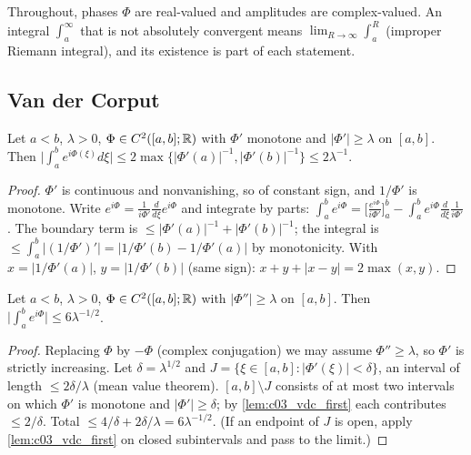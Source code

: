 Throughout, phases $\Phi$ are real-valued and amplitudes are complex-valued. An integral $\int_a^\infty$ that is not absolutely convergent means $\lim_{R\to\infty}\int_a^R$ (improper Riemann integral), and its existence is part of each statement.

\subsection{Van der Corput}

\begin{lemma}
  \label{lem:c03_vdc_first}
  Let $a<b$, $\lambda>0$, $\Phi\in C^2([a,b];\mathbb{R})$ with $\Phi'$ monotone and $|\Phi'|\ge\lambda$ on $[a,b]$. Then
  $\bigl|\int_a^be^{i\Phi(\xi)}d\xi\bigr|\le 2\max\{|\Phi'(a)|^{-1},|\Phi'(b)|^{-1}\}\le2\lambda^{-1}$.
\end{lemma}
\begin{proof}
  $\Phi'$ is continuous and nonvanishing, so of constant sign, and $1/\Phi'$ is monotone. Write $e^{i\Phi}=\frac{1}{i\Phi'}\frac{d}{d\xi}e^{i\Phi}$ and integrate by parts:
  $\int_a^be^{i\Phi}=\bigl[\frac{e^{i\Phi}}{i\Phi'}\bigr]_a^b-\int_a^be^{i\Phi}\frac{d}{d\xi}\frac1{i\Phi'}$.
  The boundary term is $\le|\Phi'(a)|^{-1}+|\Phi'(b)|^{-1}$; the integral is $\le\int_a^b|(1/\Phi')'|=|1/\Phi'(b)-1/\Phi'(a)|$ by monotonicity. With $x=|1/\Phi'(a)|$, $y=|1/\Phi'(b)|$ (same sign): $x+y+|x-y|=2\max(x,y)$.
\end{proof}

\begin{lemma}
  \label{lem:c03_vdc_second}
  Let $a<b$, $\lambda>0$, $\Phi\in C^2([a,b];\mathbb{R})$ with $|\Phi''|\ge\lambda$ on $[a,b]$. Then $\bigl|\int_a^be^{i\Phi}\bigr|\le 6\lambda^{-1/2}$.
\end{lemma}
\begin{proof}
  Replacing $\Phi$ by $-\Phi$ (complex conjugation) we may assume $\Phi''\ge\lambda$, so $\Phi'$ is strictly increasing. Let $\delta=\lambda^{1/2}$ and $J=\{\xi\in[a,b]:|\Phi'(\xi)|<\delta\}$, an interval of length $\le2\delta/\lambda$ (mean value theorem).
  $[a,b]\setminus J$ consists of at most two intervals on which $\Phi'$ is monotone and $|\Phi'|\ge\delta$; by \cref{lem:c03_vdc_first} each contributes $\le2/\delta$. Total $\le4/\delta+2\delta/\lambda=6\lambda^{-1/2}$.
  (If an endpoint of $J$ is open, apply \cref{lem:c03_vdc_first} on closed subintervals and pass to the limit.)
\end{proof}

